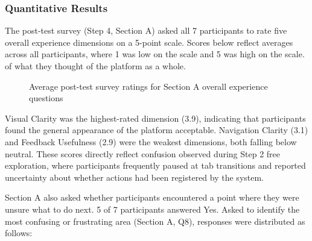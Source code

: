 \documentclass[12pt]{article}
\begin{document}
\subsubsection{Quantitative Results}

The post-test survey (Step 4, Section A) asked all 7 participants to rate five overall experience dimensions on a 5-point scale. Scores below reflect averages across all participants, where 1 was low on the scale and 5 was high on the scale. of what they thought of the platform as a whole.
\begin{figure}[H]
\centering
{}
\caption{Average post-test survey ratings for Section A overall experience questions}
\label{fig:overall-ratings}
\end{figure}

Visual Clarity was the highest-rated dimension (3.9), indicating that participants found the general appearance of the platform acceptable. Navigation Clarity (3.1) and Feedback Usefulness (2.9) were the weakest dimensions, both falling below neutral. These scores directly reflect confusion observed during Step 2 free exploration, where participants frequently paused at tab transitions and reported uncertainty about whether actions had been registered by the system.

Section A also asked whether participants encountered a point where they were unsure what to do next. 5 of 7 participants answered Yes. Asked to identify the most confusing or frustrating area (Section A, Q8), responses were distributed as follows:
\end{document}
